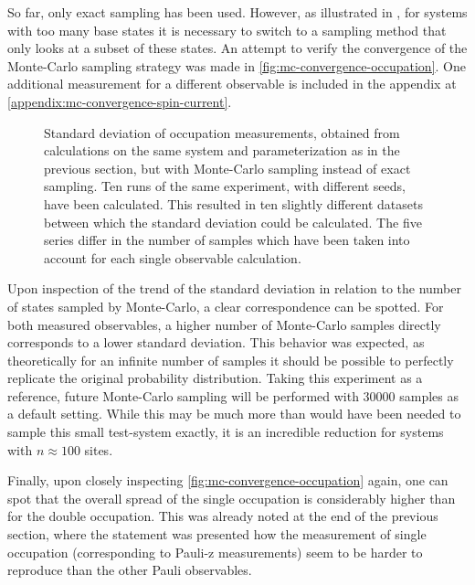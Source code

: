 So far, only exact sampling has been used. 
However, as illustrated in , for systems with too many base states it is necessary to switch to a sampling method that only looks at a subset of these states.
An attempt to verify the convergence of the Monte-Carlo sampling strategy was made in \autoref{fig:mc-convergence-occupation}.
One additional measurement for a different observable is included in the appendix at \ref{appendix:mc-convergence-spin-current}.

\begin{figure}[htbp]
    \centering
    \vspace{-0.2cm}
    \caption{
            Standard deviation of occupation measurements, obtained from calculations on the same system and parameterization as in the previous section, but with Monte-Carlo sampling instead of exact sampling.
            Ten runs of the same experiment, with different seeds, have been calculated. 
            This resulted in ten slightly different datasets between which the standard deviation could be calculated.
            The five series differ in the number of samples which have been taken into account for each single observable calculation.
        }
    \label{fig:mc-convergence-occupation}
\end{figure}

Upon inspection of the trend of the standard deviation in relation to the number of states sampled by Monte-Carlo, a clear correspondence can be spotted.
For both measured observables, a higher number of Monte-Carlo samples directly corresponds to a lower standard deviation.
This behavior was expected, as theoretically for an infinite number of samples it should be possible to perfectly replicate the original probability distribution.
Taking this experiment as a reference, future Monte-Carlo sampling will be performed with 30000 samples as a default setting.
While this may be much more than would have been needed to sample this small test-system exactly, it is an incredible reduction for systems with $n \approx 100$ sites.

Finally, upon closely inspecting \autoref{fig:mc-convergence-occupation} again, one can spot that the overall spread of the single occupation is considerably higher than for the double occupation.
This was already noted at the end of the previous section, where the statement was presented how the measurement of single occupation (corresponding to Pauli-z measurements) seem to be harder to reproduce than the other Pauli observables.